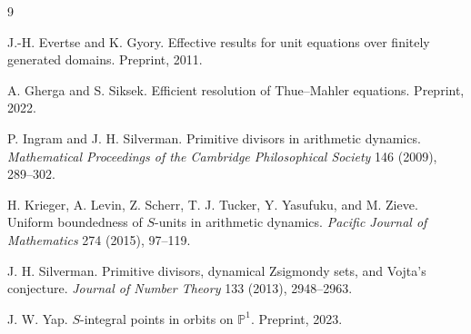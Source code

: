 \documentclass[11pt]{article}
\begin{document}
\begin{thebibliography}{9}

J.-H. Evertse and K. Gyory.
\newblock Effective results for unit equations over finitely generated domains.
\newblock Preprint, 2011.

A. Gherga and S. Siksek.
\newblock Efficient resolution of Thue--Mahler equations.
\newblock Preprint, 2022.

P. Ingram and J. H. Silverman.
\newblock Primitive divisors in arithmetic dynamics.
\newblock \emph{Mathematical Proceedings of the Cambridge Philosophical Society} 146 (2009), 289--302.

H. Krieger, A. Levin, Z. Scherr, T. J. Tucker, Y. Yasufuku, and M. Zieve.
\newblock Uniform boundedness of \(S\)-units in arithmetic dynamics.
\newblock \emph{Pacific Journal of Mathematics} 274 (2015), 97--119.

J. H. Silverman.
\newblock Primitive divisors, dynamical Zsigmondy sets, and Vojta's conjecture.
\newblock \emph{Journal of Number Theory} 133 (2013), 2948--2963.

J. W. Yap.
\newblock \(S\)-integral points in orbits on \(\mathbb P^1\).
\newblock Preprint, 2023.

\end{thebibliography}
\end{document}
